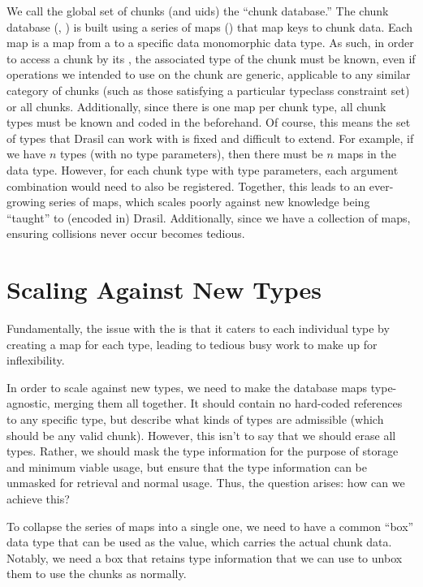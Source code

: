 We call the global set of chunks (and \acsp{uid}) the ``chunk database.'' The
chunk database (\ChunkDB{}, ) is built using a
series of maps () that map \UID{} keys to
chunk data. Each map is a map from a \UID{} to a specific data monomorphic data
type. As such, in order to access a chunk by its \UID{}, the associated type of
the chunk must be known, even if operations we intended to use on the chunk are
generic, applicable to any similar category of chunks (such as those satisfying
a particular typeclass constraint set) or all chunks. Additionally, since there
is one map per chunk type, all chunk types must be known and coded in the
\ChunkDB{} beforehand. Of course, this means the set of types that Drasil can
work with is fixed and difficult to extend. For example, if we have \(n\) types
(with no type parameters), then there must be \(n\) maps in the \ChunkDB{} data
type. However, for each chunk type with type parameters, each argument
combination would need to also be registered. Together, this leads to an
ever-growing series of maps, which scales poorly against new knowledge being
``taught'' to (encoded in) Drasil. Additionally, since we have a collection of
maps, ensuring \UID{} collisions never occur becomes tedious.

\originalChunkDBHaskell{}

\section{Scaling Against New Types}
\label{chap:storingChunks:sec:scaling-against-new-types}

Fundamentally, the issue with the \ChunkDB{} is that it caters to each
individual type by creating a map for each type, leading to tedious busy work to
make up for inflexibility.

In order to scale against new types, we need to make the database maps
type-agnostic, merging them all together. It should contain no hard-coded
references to any specific type, but describe what kinds of types are admissible
(which should be any valid chunk). However, this isn't to say that we should
erase all types. Rather, we should mask the type information for the purpose of
storage and minimum viable usage, but ensure that the type information can be
unmasked for retrieval and normal usage. Thus, the question arises: how can we
achieve this?

To collapse the series of maps into a single one, we need to have a common
``box'' data type that can be used as the value, which carries the actual chunk
data. Notably, we need a box that retains type information that we can use to
unbox them to use the chunks as normally.

